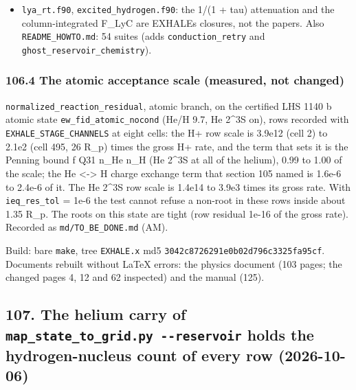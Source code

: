 \documentclass[english,a4paper]{my_memo}
\begin{document}
\begin{itemize}
  element on its own nuclei velocity (section 82); the J\_lya estimate of
  Huang et al. (2017) is the order-of-magnitude estimate in the text after
  their Eq. (6), Section 2, page 3 (READ in the published PDF,
  \texttt{references/Huang\_2017\_ApJ\_851\_150.pdf}; Eq. 6 is the n(2l)/n(1s) ratio),
  and the recombination assumption is on page 3, not 11.
\item
  \texttt{lya\_rt.f90}, \texttt{excited\_hydrogen.f90}: the 1/(1 + tau) attenuation and the
  column-integrated F\_LyC are EXHALE\textquotesingle s closures, not the paper\textquotesingle s.
  Also \texttt{README\_HOWTO.md}: 54 suites (adds \texttt{conduction\_retry} and
  \texttt{ghost\_reservoir\_chemistry}).
\end{itemize}

\subsubsection{106.4 The atomic acceptance scale (measured, not changed)}\label{1064-the-atomic-acceptance-scale-measured-not-changed}

\texttt{normalized\_reaction\_residual}, atomic branch, on the certified LHS 1140 b
atomic state \texttt{ew\_fid\_atomic\_nocond} (He/H 9.7, He 2\^{}3S on), rows recorded with
\texttt{EXHALE\_STAGE\_CHANNELS} at eight cells: the H+ row scale is 3.9e12 (cell 2)
to 2.1e2 (cell 495, 26 R\_p) times the gross H+ rate, and the term that sets
it is the Penning bound f Q31 n\_He n\_H (He 2\^{}3S at all of the helium), 0.99 to
1.00 of the scale; the He \textless-\textgreater{} H charge exchange term that section 105 named is
1.6e-6 to 2.4e-6 of it. The He 2\^{}3S row scale is 1.4e14 to 3.9e3 times its
gross rate. With \texttt{ieq\_res\_tol} = 1e-6 the test cannot refuse a non-root in
these rows inside about 1.35 R\_p. The roots on this state are tight (row
residual 1e-16 of the gross rate). Recorded as \texttt{md/TO\_BE\_DONE.md} (AM).

Build: bare \texttt{make}, tree \texttt{EXHALE.x} md5 \texttt{3042c8726291e0b02d796c3325fa95cf}.
Documents rebuilt without LaTeX errors: the physics document (103 pages; the
changed pages 4, 12 and 62 inspected) and the manual (125).

\subsection{\texorpdfstring{107. The helium carry of \texttt{map\_state\_to\_grid.py\ -\/-reservoir} holds the hydrogen-nucleus count of every row (2026-10-06)}{107. The helium carry of map\_state\_to\_grid.py -\/-reservoir holds the hydrogen-nucleus count of every row (2026-10-06)}}\label{107-the-helium-carry-of-map_state_to_gridpy---reservoir-holds-the-hydrogen-nucleus-count-of-every-row-2026-10-06}
\end{document}
